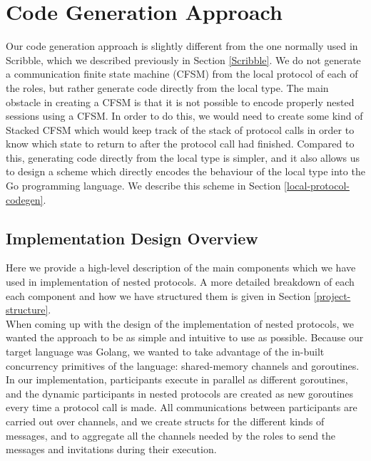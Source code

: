 \documentclass[12pt,twoside]{report}
\begin{document}

\section{Code Generation Approach}
Our code generation approach is slightly different from the one normally used in Scribble, which we described previously in Section \ref{Scribble}. We do not generate a communication finite state machine (CFSM) from the local protocol of each of the roles, but rather generate code directly from the local type. The main obstacle in creating a CFSM is that it is not possible to encode properly nested sessions using a CFSM. In order to do this, we would need to create some kind of Stacked CFSM which would keep track of the stack of protocol calls in order to know which state to return to after the protocol call had finished. Compared to this, generating code directly from the local type is simpler, and it also allows us to design a scheme which directly encodes the behaviour of the local type into the Go programming language. We describe this scheme in Section \ref{local-protocol-codegen}.

\subsection{Implementation Design Overview}
Here we provide a high-level description of the main components which we have used in implementation of nested protocols. A more detailed breakdown of each each component and how we have structured them is given in Section \ref{project-structure}. \\

When coming up with the design of the implementation of nested protocols, we wanted the approach to be as simple and intuitive to use as possible. Because our target language was Golang, we wanted to take advantage of the in-built concurrency primitives of the language: shared-memory channels and goroutines.\\

In our implementation, participants execute in parallel as different goroutines, and the dynamic participants in nested protocols are created as new goroutines every time a protocol call is made. All communications between participants are carried out over channels, and we create structs for the different kinds of messages, and to aggregate all the channels needed by the roles to send the messages and invitations during their execution.\\
\end{document}
